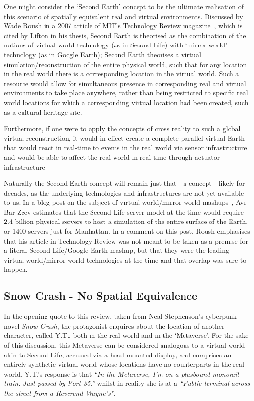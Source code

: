 One might consider the `Second Earth' concept to be the ultimate realisation of this scenario of spatially equivalent real and virtual environments. Discussed by Wade Roush in a 2007 article of MIT's Technology Review magazine~\cite{Roush2007}, which is cited by Lifton in his thesis, Second Earth is theorised as the combination of the notions of virtual world technology (as in Second Life) with `mirror world' technology (as in Google Earth); Second Earth theorises a virtual simulation/reconstruction of the entire physical world, such that for any location in the real world there is a corresponding location in the virtual world. Such a resource would allow for simultaneous presence in corresponding real and virtual environments to take place anywhere, rather than being restricted to specific real world locations for which a corresponding virtual location had been created, such as a cultural heritage site.

Furthermore, if one were to apply the concepts of cross reality to such a global virtual reconstruction, it would in effect create a complete parallel virtual Earth that would react in real-time to events in the real world via sensor infrastructure and would be able to affect the real world in real-time through actuator infrastructure.

Naturally the Second Earth concept will remain just that - a concept - likely for decades, as the underlying technologies and infrastructures are not yet available to us. In a blog post on the subject of virtual world/mirror world mashups~\cite{Bar-Zeev2007}, Avi Bar-Zeev estimates that the Second Life server model at the time would require 2.4 billion physical servers to host a simulation of the entire surface of the Earth, or 1400 servers just for Manhattan. In a comment on this post, Roush emphasises that his article in Technology Review was not meant to be taken as a premise for a literal Second Life/Google Earth mashup, but that they were the leading virtual world/mirror world technologies at the time and that overlap was sure to happen.

\subsection{Snow Crash - No Spatial Equivalence}
In the opening quote to this review, taken from Neal Stephenson's cyberpunk novel \textit{Snow Crash}, the protagonist enquires about the location of another character, called Y.T., both in the real world and in the `Metaverse'. For the sake of this discussion, this Metaverse can be considered analogous to a virtual world akin to Second Life, accessed via a head mounted display, and comprises an entirely synthetic virtual world whose locations have no counterparts in the real world. Y.T.'s response is that \textit{``In  the Metaverse, I'm on a plusbound monorail train. Just passed by Port 35.''} whilst in reality she is at a \textit{``Public terminal across the street from a Reverend Wayne's"}.

